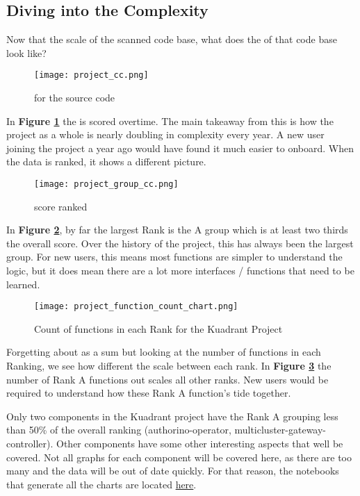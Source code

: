 \subsection{Diving into the Complexity}

Now that the scale of the scanned code base, what does the \cc of that code base look like?

\begin{figure}
	\texttt{[image: project\_cc.png]}
	\caption{\cc for the source code}
	\label{fig:project_cc}
\end{figure}

In \textbf{Figure \ref{fig:project_cc}} the \cc is scored overtime.
The main takeaway from this is how the project as a whole is nearly doubling in complexity every year.
A new user joining the project a year ago would have found it much easier to onboard.
When the data is ranked, it shows a different picture.

\begin{figure}
	\texttt{[image: project\_group\_cc.png]}
	\caption{\cc score ranked}
	\label{fig:project_group_cc}
\end{figure}

In \textbf{Figure \ref{fig:project_group_cc}}, by far the largest Rank is the A group which is at least two thirds the overall score.
Over the history of the project, this has always been the largest group.
For new users, this means most functions are simpler to understand the logic, but it does mean there are a lot more interfaces / functions that need to be learned.

\begin{figure}
	\texttt{[image: project\_function\_count\_chart.png]}
	\caption{Count of functions in each Rank for the Kuadrant Project}
	\label{fig:project_function_count_chart}
\end{figure}

Forgetting about \cc as a sum but looking at the number of functions in each Ranking, we see how different the scale between each rank.
In \textbf{Figure \ref{fig:project_function_count_chart}} the number of Rank A functions out scales all other ranks.
New users would be required to understand how these Rank A function's tide together.

Only two components in the Kuadrant project have the Rank A grouping less than 50\% of the overall ranking (authorino-operator, multicluster-gateway-controller).
Other components have some other interesting aspects that well be covered.
Not all graphs for each component will be covered here, as there are too many and the data will be out of date quickly.
For that reason, the notebooks that generate all the charts are located \href{https://www.github.com/Boomatang/cyclomatic-complexity}{here}.

